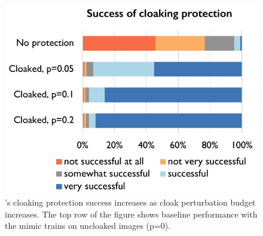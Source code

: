 \begin{figure}[t]
  \centering
  \begin{minipage}{0.32\textwidth}
  \centering
  \includegraphics[width=1\columnwidth]{plots/eval/user-cloak-budget.pdf}
  \vspace{-0.23in}
  \caption{\system{}'s cloaking protection success increases as cloak perturbation budget increases. The top row of the figure shows baseline performance with the mimic trains on uncloaked images (p=0). }
  \label{fig:budget-increase}
  \end{minipage}
  \hfill
    \centering
    \begin{minipage}{0.32\textwidth}
  \vspace{0.23in}
  \centering
\end{minipage}
\end{figure}
